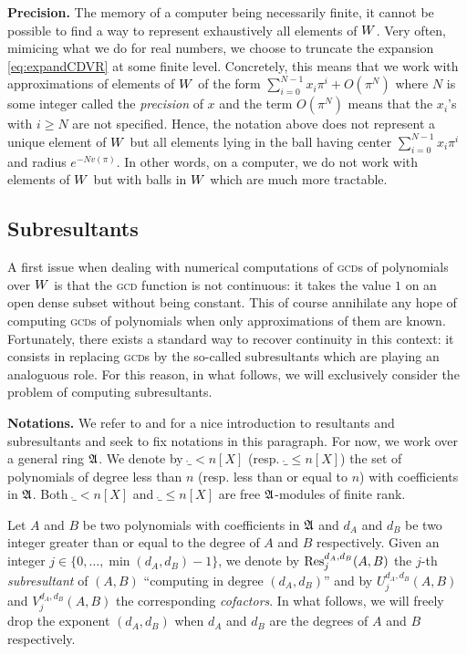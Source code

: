 \documentclass{sig-alternate}
\begin{document}
\noindent
\textbf{Precision.}
The memory of a computer being necessarily finite, it cannot be possible 
to find a way to represent exhaustively all elements of $W$. 
Very often, mimicing what we do for real numbers, we choose to truncate 
the expansion \eqref{eq:expandCDVR} at some finite level. Concretely,
this means that we work with approximations of elements of $W$ of the
form
$\sum_{i=0}^{N-1} x_i \pi^i + O(\pi^N)$
where $N$ is some integer called the \emph{precision} of $x$ and 
the term $O(\pi^N)$ means that the $x_i$'s with $i \geq N$ are not 
specified. Hence, the notation above does not represent a unique
element of $W$ but all elements lying in the ball having center
$\sum_{i=0}^{N-1} x_i \pi^i$ and radius $e^{-N v(\pi)}$. In other
words, on a computer, we do not work with elements of $W$ but with
balls in $W$ which are much more tractable.

\subsection{Subresultants}
\label{subsec:subres}

A first issue when dealing with numerical computations of \textsc{gcd}s 
of polynomials over $W$ is that the \textsc{gcd} function is not 
continuous: it takes the value $1$ on an open dense subset without being 
constant. This of course annihilate any hope of computing \textsc{gcd}s 
of polynomials when only approximations of them are known. Fortunately, 
there exists a standard way to recover continuity in this context: it 
consists in replacing \textsc{gcd}s by the so-called subresultants which 
are playing an analoguous role. For this reason, in what follows, we will 
exclusively consider the problem of computing subresultants.

\medskip

\noindent
\textbf{Notations.} We refer to \cite[\S 3.3]{cohen} and \cite[\S 4.1]{winkler}
for a nice 
introduction to resultants and subresultants and seek to fix notations
in this paragraph. For now, we work over a 
general ring $\mathfrak A$. We denote by $\ring_{<n}[X]$ (resp. $\ring_{\leq 
n}[X]$) the set of polynomials of degree less than $n$ (resp. less than 
or equal to $n$) with coefficients in $\mathfrak A$. Both $\ring_{<n}[X]$ and 
$\ring_{\leq n}[X]$ are free $\mathfrak A$-modules of finite rank.

Let $A$ and $B$ be two polynomials with coefficients in $\mathfrak A$ and 
$d_A$ and $d_B$ be two integer greater than or equal to the degree of 
$A$ and $B$ respectively. Given an integer $j \in \{0, \ldots, \min 
(d_A, d_B)-1\}$, we denote by $\text{\rm Res}_j^{d_A, d_B}(A,B)$ the $j$-th 
\emph{subresultant} of $(A,B)$ ``computing in degree $(d_A, d_B)$'' and 
by $U_j^{d_A, d_B}(A,B)$ and $V_j^{d_A, d_B}(A,B)$ the corresponding 
\emph{cofactors}. In what follows, we will freely drop the exponent 
$(d_A,d_B)$ when $d_A$ and $d_B$ are the degrees of $A$ and $B$ 
respectively.
\end{document}
